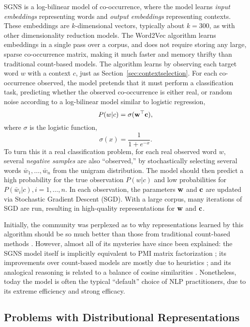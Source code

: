 SGNS is a log-bilinear model of co-occurrence, where the model learns {\em
input embeddings} representing words and {\em output embeddings} representing
contexts. These embeddings are $k$-dimensional vectors, typically about $k =
300$, as with other dimensionality reduction models.  The Word2Vec algorithm
learns embeddings in a single pass over a corpus, and does not require storing
any large, sparse co-occurrence matrix, making it much faster and memory
thrifty than traditional count-based models. The algorithm learns by observing
each target word $w$ with a context $c$, just as
Section~\ref{sec:contextselection}. For each co-occurrence observed, the model
pretends that it must perform a classification task, predicting whether the
observed co-occurrence is either real, or random noise according to a
log-bilinear model similar to logistic regression,
\begin{equation}
  P(w|c) = \sigma({\mathbf{w}}^{\top}{\mathbf{c}}),
\end{equation}
where $\sigma$ is the logistic function,
\begin{equation}
  \sigma(x) = \frac{1}{1 + e^{-x}}.
\end{equation}
To turn this it a real classification problem, for each real observed word $w$,
several {\em negative samples} are also ``observed,'' by stochastically selecting
several words $\bar w_1,\ldots,\bar w_n$ from the unigram distribution. The
model should then predict a high probability for the true observation $P(w|c)$
and low probabilities for $P(\bar w_i|c), i = 1,\ldots,n$. In each observation,
the parameters ${\mathbf{w}}$ and ${\mathbf{c}}$ are updated via Stochastic Gradient Descent
(SGD). With a large corpus, many iterations of SGD are run, resulting in
high-quality representations for ${\mathbf{w}}$ and ${\mathbf{c}}$.

Initially, the community was perplexed as to why representations learned by
this algorithm should be so much better than those from traditional count-based
methods \cite{baroni:2014:acl}. However, almost all of its mysteries have since
been explained: the SGNS model itself is implicitly equivalent to PMI matrix
factorization \cite{levy:2014:nips}; its improvements over count-based models
are mostly due to heuristics \cite{levy:2015:tacl}; and its analogical
reasoning is related to a balance of cosine similarities
\cite{levy:2014b:conll}. Nonetheless, today the model is often the typical
``default'' choice of NLP practitioners, due to its extreme efficiency and
strong efficacy.

\subsection{Problems with Distributional Representations}

